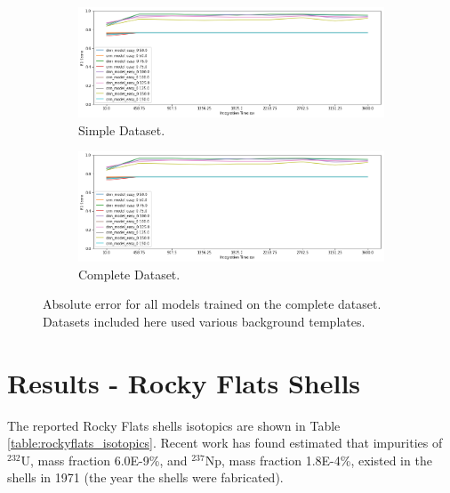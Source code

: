 \begin{figure}[H]
     \centering
     \begin{subfigure}[b]{0.9\textwidth}
         \centering
         \includegraphics[width=\textwidth]{images/results_easy_distance_comparison}
         \caption{Simple Dataset.}
         \label{fig:results_full_background_inject_simple}
     \end{subfigure}

     \begin{subfigure}[b]{0.9\textwidth}
         \centering
         \includegraphics[width=\textwidth]{images/results_easy_distance_comparison}
         \caption{Complete Dataset.}
         \label{fig:results_full_background_inject_full}
     \end{subfigure}
        \caption{Absolute error for all models trained on the complete dataset. Datasets included here used various background templates.}
        \label{fig:results_full_background_inject}
\end{figure}


\section{Results - Rocky Flats Shells}



The reported Rocky Flats shells isotopics are shown in Table \ref{table:rockyflats_isotopics}. Recent work has found estimated that impurities of $^{232}$U, mass fraction 6.0E-9\%, and $^{237}$Np, mass fraction 1.8E-4\%, \cite{RawoolSullivan2012} existed in the shells in 1971 (the year the shells were fabricated).

